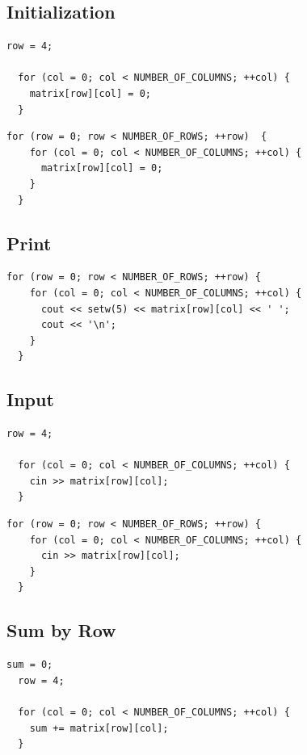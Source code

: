 \documentclass{article}
\begin{document}
\subsection{Initialization}
\begin{lstlisting}[caption={Initialize Row Number 4}]
  row = 4;

  for (col = 0; col < NUMBER_OF_COLUMNS; ++col) {
    matrix[row][col] = 0;
  }
\end{lstlisting}

\begin{lstlisting}[caption={Initialize Entire Matrix}]
  for (row = 0; row < NUMBER_OF_ROWS; ++row)  {
    for (col = 0; col < NUMBER_OF_COLUMNS; ++col) {
      matrix[row][col] = 0;
    }
  }
\end{lstlisting}

\subsection{Print}
\begin{lstlisting}[caption={Output Components of a Two-Dimensional Array}]
  for (row = 0; row < NUMBER_OF_ROWS; ++row) { 
    for (col = 0; col < NUMBER_OF_COLUMNS; ++col) {
      cout << setw(5) << matrix[row][col] << ' '; 
      cout << '\n';
    }
  }
\end{lstlisting}

\subsection{Input}
\begin{lstlisting}[caption={Adding Input to 4th Row}]
  row = 4;

  for (col = 0; col < NUMBER_OF_COLUMNS; ++col) {
    cin >> matrix[row][col];
  }
\end{lstlisting}

\begin{lstlisting}[caption={Adding Input to Each Component of Matrix}]
  for (row = 0; row < NUMBER_OF_ROWS; ++row) {
    for (col = 0; col < NUMBER_OF_COLUMNS; ++col) {
      cin >> matrix[row][col];
    }
  }
\end{lstlisting}

\subsection{Sum by Row}
\begin{lstlisting}[caption={Find the Sum of Row Number 4}]
  sum = 0;
  row = 4;

  for (col = 0; col < NUMBER_OF_COLUMNS; ++col) {
    sum += matrix[row][col];
  }
\end{lstlisting}
\end{document}
